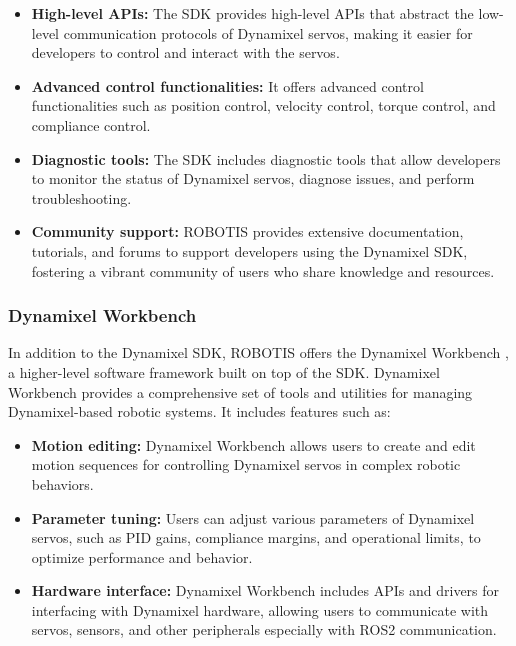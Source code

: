 \begin{itemize}
    \item \textbf{High-level APIs:} The SDK provides high-level APIs that abstract the low-level communication protocols of Dynamixel servos, making it easier for developers to control and interact with the servos.
    
    \item \textbf{Advanced control functionalities:} It offers advanced control functionalities such as position control, velocity control, torque control, and compliance control.
    
    \item \textbf{Diagnostic tools:} The SDK includes diagnostic tools that allow developers to monitor the status of Dynamixel servos, diagnose issues, and perform troubleshooting.
    
    \item \textbf{Community support:} ROBOTIS provides extensive documentation, tutorials, and forums to support developers using the Dynamixel SDK, fostering a vibrant community of users who share knowledge and resources.
\end{itemize}

\subsubsection{Dynamixel Workbench}
In addition to the Dynamixel SDK, ROBOTIS offers the Dynamixel Workbench \cite{dynamixel_workbench}, a higher-level software framework built on top of the SDK. Dynamixel Workbench provides a comprehensive set of tools and utilities for managing Dynamixel-based robotic systems. It includes features such as:

\begin{itemize}
    \item \textbf{Motion editing:} Dynamixel Workbench allows users to create and edit motion sequences for controlling Dynamixel servos in complex robotic behaviors.
    
    \item \textbf{Parameter tuning:} Users can adjust various parameters of Dynamixel servos, such as PID gains, compliance margins, and operational limits, to optimize performance and behavior.
    
    \item \textbf{Hardware interface:} Dynamixel Workbench includes APIs and drivers for interfacing with Dynamixel hardware, allowing users to communicate with servos, sensors, and other peripherals especially with ROS2 communication.
\end{itemize}

